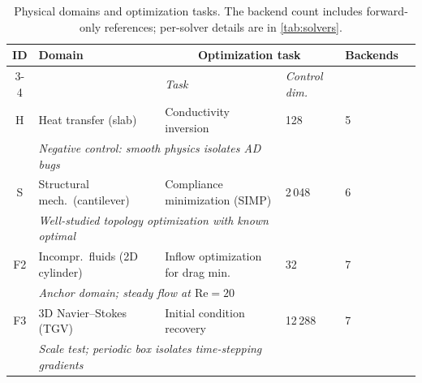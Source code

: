 \documentclass{article}
\begin{document}
\begin{table}[t]
  \centering\small
  \caption{Physical domains and optimization tasks. The backend count
    includes forward-only references; per-solver details are in
    \cref{tab:solvers}.}
  \label{tab:domains}
  \begin{tabularx}{\linewidth}{cXXlll}
    \toprule
    \textbf{ID} & \textbf{Domain}
      & \multicolumn{2}{c}{\textbf{Optimization task}} & \textbf{Backends} \\
    \cmidrule(lr){3-4}
    & & \textit{Task} & \textit{Control dim.} & \\
    \midrule
    H & Heat transfer (slab) & Conductivity inversion
      & 128 & 5 \\
    & \multicolumn{2}{l}{\textit{%
      Negative control: smooth physics isolates AD bugs}} & & \\[5pt]
    S & Structural mech.\ (cantilever) & Compliance minimization (SIMP)
      & 2\,048 & 6 \\
    & \multicolumn{2}{l}{\textit{%
      Well-studied topology optimization with known optimal}} & & \\[5pt]
    F2 & Incompr.\ fluids (2D cylinder) & Inflow optimization for drag min.
      & 32 & 7 \\
    & \multicolumn{2}{l}{\textit{%
      Anchor domain; steady flow at $\mathrm{Re}{=}20$}} & & \\[5pt]
    F3 & 3D Navier--Stokes (TGV) & Initial condition recovery
      & 12\,288 & 7 \\
    & \multicolumn{2}{l}{\textit{%
      Scale test; periodic box isolates time-stepping gradients}} & & \\
    \bottomrule
  \end{tabularx}
\end{table}
\end{document}
